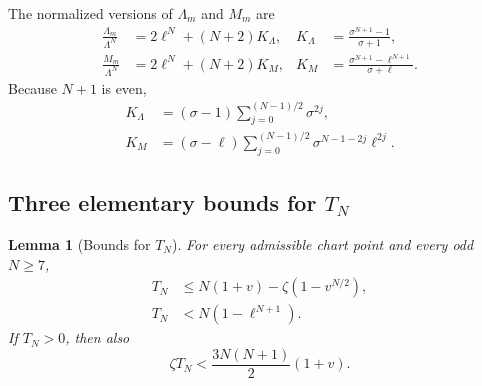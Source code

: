 \documentclass[11pt]{article}
\newtheorem{lemma}[theorem]{Lemma}
\numberwithin{equation}{section}
\begin{document}
The normalized versions of $\Lambda_m$ and $M_m$ are
\begin{align}
  \frac{\Lambda_m}{\Lambda^N}
  &=2\ell^N+(N+2)K_\Lambda,
  &
  K_\Lambda&=\frac{\sigma^{N+1}-1}{\sigma+1},
  \label{eq:plt23-KA-def}\\
  \frac{M_m}{\Lambda^N}
  &=2\ell^N+(N+2)K_M,
  &
  K_M&=\frac{\sigma^{N+1}-\ell^{N+1}}{\sigma+\ell}.
  \label{eq:plt23-KL-def}
\end{align}
Because $N+1$ is even,
\begin{align}
  K_\Lambda&=(\sigma-1)
  \sum_{j=0}^{(N-1)/2}\sigma^{2j},
  \label{eq:plt23-KA-sum}\\
  K_M&=(\sigma-\ell)
  \sum_{j=0}^{(N-1)/2}
  \sigma^{N-1-2j}\ell^{2j}.
  \label{eq:plt23-KL-sum}
\end{align}

\subsection{Three elementary bounds for \texorpdfstring{$T_N$}{TN}}

\begin{lemma}[Bounds for $T_N$]\label{lem:plt23-T-bounds}
  For every admissible chart point and every odd $N\ge7$,
  \begin{align}
    T_N&\le N(1+v)-\zeta(1-v^{N/2}),
    \label{eq:plt23-T-bound-one}\\
    T_N&<N(1-\ell^{N+1}).
    \label{eq:plt23-T-bound-two}
  \end{align}
  If $T_N>0$, then also
  \begin{equation}\label{eq:plt23-T-tangent-bound}
    \zeta T_N<\frac{3N(N+1)}{2}(1+v).
  \end{equation}
\end{lemma}
\end{document}
